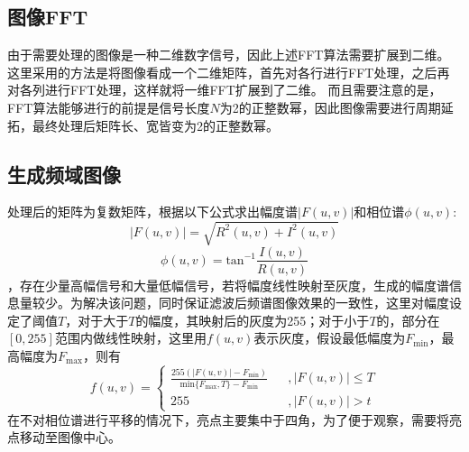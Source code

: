 \documentclass[UTF8]{ctexart}
\begin{document}
	\subsection{图像FFT}
		由于需要处理的图像是一种二维数字信号，因此上述FFT算法需要扩展到二维。这里采用的方法是将图像看成一个二维矩阵，首先对各行进行FFT处理，之后再对各列进行FFT处理，这样就将一维FFT扩展到了二维。
		而且需要注意的是，FFT算法能够进行的前提是信号长度$N$为2的正整数幂，因此图像需要进行周期延拓，最终处理后矩阵长、宽皆变为2的正整数幂。

	\subsection{生成频域图像}
		处理后的矩阵为复数矩阵，根据以下公式求出幅度谱$|F(u,v)|$和相位谱$\phi(u,v)$:
		\[
			|F(u,v)| = \sqrt{R^2(u,v) + I^2(u,v)}
		\]
		\[
			\phi(u,v) = \textrm{tan}^{-1}\frac{I(u,v)}{R(u,v)}
		\]
		，存在少量高幅信号和大量低幅信号，若将幅度线性映射至灰度，生成的幅度谱信息量较少。为解决该问题，同时保证滤波后频谱图像效果的一致性，这里对幅度设定了阈值$T$，对于大于$T$的幅度，其映射后的灰度为255；对于小于$T$的，部分在$[0,255]$范围内做线性映射，这里用$f(u,v)$表示灰度，假设最低幅度为$F_{\textrm{min}}$，最高幅度为$F_{\textrm{max}}$，则有
		\[
			f(u,v) = \left\{
				\begin{array}{lcl}
				\frac{255(|F(u,v)|-F_{\textrm{min}})}{\textrm{min}\{F_{\textrm{max}},T\}-F_{\textrm{min}} } & &, {|F(u,v)| \leq T} \\
				255 & &, {|F(u,v)| > t}
				\end{array}
			\right.
		\]
		在不对相位谱进行平移的情况下，亮点主要集中于四角，为了便于观察，需要将亮点移动至图像中心。
\end{document}
